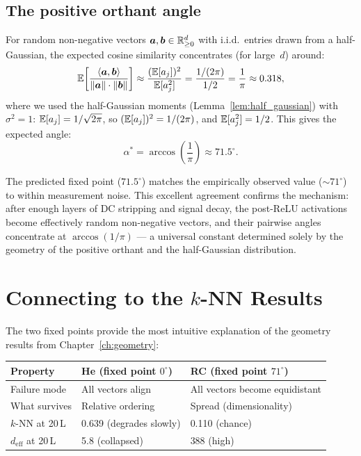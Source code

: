 \subsection{The positive orthant angle}

For random non-negative vectors $\bm{a}, \bm{b} \in \mathbb{R}_{\geq 0}^d$
with i.i.d.\ entries drawn from a half-Gaussian, the expected cosine
similarity concentrates (for large~$d$) around:
\begin{equation}
  \mathbb{E}\!\left[\frac{\langle \bm{a}, \bm{b} \rangle}
    {\|\bm{a}\| \cdot \|\bm{b}\|}\right]
  \approx \frac{(\mathbb{E}[a_j])^2}{\mathbb{E}[a_j^2]}
  = \frac{1/(2\pi)}{1/2}
  = \frac{1}{\pi}
  \approx 0.318,
\end{equation}
where we used the half-Gaussian moments
(Lemma~\ref{lem:half_gaussian}) with $\sigma^2 = 1$:
$\mathbb{E}[a_j] = 1/\sqrt{2\pi}$, so $(\mathbb{E}[a_j])^2 = 1/(2\pi)$, and
$\mathbb{E}[a_j^2] = 1/2$.
This gives the expected angle:
\begin{equation}\label{eq:fixed_point}
  \alpha^*
  = \arccos\!\left(\frac{1}{\pi}\right)
  \approx 71.5^\circ.
\end{equation}

\begin{remark}
The predicted fixed point ($71.5^\circ$) matches the empirically
observed value ($\sim\!71^\circ$) to within measurement noise.
This excellent agreement confirms the mechanism: after enough layers
of DC stripping and signal decay, the post-ReLU activations become
effectively random non-negative vectors, and their pairwise angles
concentrate at $\arccos(1/\pi)$ --- a universal constant determined
solely by the geometry of the positive orthant and the half-Gaussian
distribution.
\end{remark}

\section{Connecting to the $k$-NN Results}
\label{sec:connecting_knn}

The two fixed points provide the most intuitive explanation of the
geometry results from Chapter~\ref{ch:geometry}:

\begin{center}
\begin{tabular}{lll}
\toprule
Property & He (fixed point $0^\circ$) & RC (fixed point $71^\circ$) \\
\midrule
Failure mode & All vectors align & All vectors become equidistant \\
What survives & Relative ordering & Spread (dimensionality) \\
$k$-NN at 20\,L & 0.639 (degrades slowly) & 0.110 (chance) \\
$d_{\mathrm{eff}}$ at 20\,L & 5.8 (collapsed) & 388 (high) \\
\bottomrule
\end{tabular}
\end{center}

